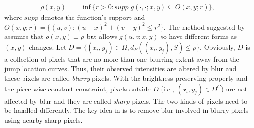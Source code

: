 \begin{align*}
  \rho(x,y) &=\inf\{r>0: supp\; g(\cdot, \cdot; x,y) \subseteq O(x,y; r) \}, 
\end{align*}
where \(supp\) denotes the function's support and \(O(x,y;r) = \{(u,v): (u-x)^2+(v-y)^2 \leq r^2 \}\). The method suggested by \citet{kang2020consistent} assumes that \(\rho(x,y) \equiv \rho\) but allows \(g(u,v;x,y)\) to have different forms as \((x,y)\) changes. Let \(D=\{(x_i, y_j)\in \Omega, d_E((x_i,y_j), S)\leq \rho  \}\). Obviously, \(D\) is a collection of pixels that are no more than one blurring extent away from the jump location curves. Thus, their observed intensities are altered by blur and these pixels are called \textit{blurry} pixels. With the brightness-preserving property and the piece-wise constant constraint, pixels outside \(D\) (i.e., \((x_i, y_j)\in D^C\)) are not affected by blur and they are called \textit{sharp} pixels. The two kinds of pixels need to be handled differently. The key idea in \citet{kang2020consistent} is to remove blur involved in blurry pixels using nearby sharp pixels.

